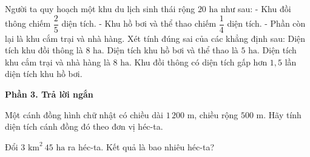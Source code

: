 \begin{ex} %
Người ta quy hoạch một khu du lịch sinh thái rộng $20\text{ ha}$ như sau:
- Khu đồi thông chiếm $\dfrac{2}{5}$ diện tích.
- Khu hồ bơi và thể thao chiếm $\dfrac{1}{4}$ diện tích.
- Phần còn lại là khu cắm trại và nhà hàng.
Xét tính đúng sai của các khẳng định sau:
\choiceTF
{\True Diện tích khu đồi thông là $8\text{ ha}$.}
{\True Diện tích khu hồ bơi và thể thao là $5\text{ ha}$.}
{Diện tích khu cắm trại và nhà hàng là $8\text{ ha}$.}
{\True Khu đồi thông có diện tích gấp hơn $1{,}5$ lần diện tích khu hồ bơi.}
\end{ex}

\textbf{Phần 3. Trả lời ngắn}

\begin{ex} %
Một cánh đồng hình chữ nhật có chiều dài $1\,200\text{ m}$, chiều rộng $500\text{ m}$. Hãy tính diện tích cánh đồng đó theo đơn vị héc-ta.
\end{ex}

\begin{ex} %
Đổi $3\text{ km}^2\ 45\text{ ha}$ ra héc-ta. Kết quả là bao nhiêu héc-ta?
\end{ex}

